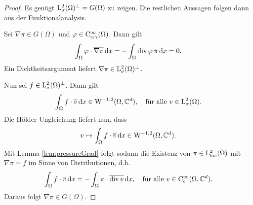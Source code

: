 \begin{proof}
  Es genügt $\mathrm{L}^2_\sigma(\Omega)^\perp = G(\Omega)$ zu zeigen.
  Die restlichen Aussagen folgen dann aus der Funktionalanalysis.
  
  Sei $\nabla\pi \in G(\Omega)$ und $\varphi \in \mathrm{C}_{\mathrm{c}, \gamma}^\infty(\Omega)$.
  Dann gilt
  $$
  \int_\Omega \varphi \cdot \overline{\nabla\pi} \, {\operatorname{d}\!{x}} = -\int_\Omega \mathrm{div\,} \varphi \, \overline \pi \, {\operatorname{d}\!{x}} = 0.
  $$
  Ein Dichtheitsargument liefert $\nabla \pi \in \mathrm{L}_\sigma^2(\Omega)^\perp$.

  Nun sei $f \in \mathrm{L}_\sigma^2(\Omega)^\perp$.
  Dann gilt 
  $$
  \int_\Omega f \cdot \overline v \, {\operatorname{d}\!{x}} \in \mathrm{W}^{-1, 2}(\Omega, \mathbb{C}^d), \quad\text{für alle } v \in \mathrm{L}^2_\sigma(\Omega).
  $$
  Die Hölder-Ungleichung liefert nun, dass
  $$
  v \mapsto \int_\Omega f \cdot \overline v \, {\operatorname{d}\!{x}} \in \mathrm{W}^{-1,2}(\Omega,\mathbb{C}^d).
  $$
  Mit Lemma \ref{lem:pressureGrad} folgt sodann die Existenz von $\pi \in \mathrm{L}^2_{\operatorname{loc}}(\Omega)$ mit $\nabla \pi = f$ im Sinne von Distributionen, d.h.
  $$
  \int_\Omega f \cdot \overline v \, {\operatorname{d}\!{x}} 
  = - \int_\Omega \pi \cdot \overline{\mathrm{div\,} v} \, {\operatorname{d}\!{x}}, \quad \text{für alle } v \in \mathrm{C}_{\mathrm{c}}^\infty(\Omega, \mathbb{C}^d).
  $$
  Daraus folgt $\nabla \pi \in G(\Omega)$.
\end{proof}
